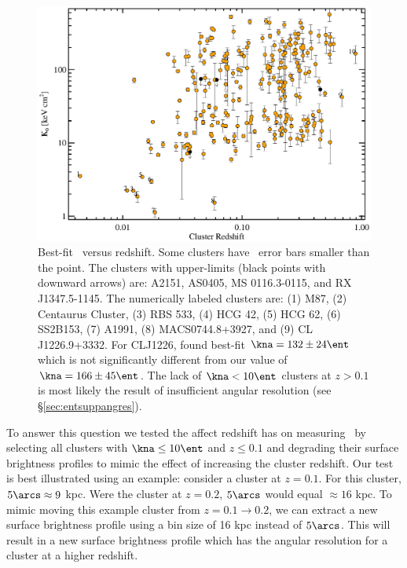 \begin{figure}[htp]
  \begin{center}
    \begin{minipage}[htp]{\linewidth}
      \includegraphics*[width=\textwidth, trim=5mm 0mm 5mm 5mm, clip]{k0res}
      \caption[Best-fit \kna\ versus redshift.]{Best-fit \kna\ versus
        redshift. Some clusters have \kna\ error bars smaller than the
        point. The clusters with upper-limits (black points with
        downward arrows) are: A2151, AS0405, MS 0116.3-0115, and RX
        J1347.5-1145. The numerically labeled clusters are: (1) M87,
        (2) Centaurus Cluster, (3) RBS 533, (4) HCG 42, (5) HCG 62,
        (6) SS2B153, (7) A1991, (8) MACS0744.8+3927, and (9) CL
        J1226.9+3332. For CLJ1226, \cite{2007ApJ...659.1125M} found
        best-fit $\kna = 132 \pm 24 \ent$ which is not significantly
        different from our value of $\kna = 166 \pm 45 \ent$. The lack
        of $\kna < 10 \ent$ clusters at $z > 0.1$ is most likely the
        result of insufficient angular resolution (see
        \S\ref{sec:entsuppangres}).}
      \label{fig:k0res}
    \end{minipage}
  \end{center}
\end{figure}

To answer this question we tested the affect redshift has on measuring
\kna\ by selecting all clusters with $\kna \leq 10 \ent$ and $z \leq
0.1$ and degrading their surface brightness profiles to mimic the
effect of increasing the cluster redshift. Our test is best
illustrated using an example: consider a cluster at $z = 0.1$. For
this cluster, $5\arcs \approx 9$ kpc. Were the cluster at $z = 0.2$, $5\arcs$
would equal $\approx 16$ kpc. To mimic moving this example cluster
from $z = 0.1 \rightarrow 0.2$, we can extract a new surface
brightness profile using a bin size of 16 kpc instead of $5\arcs$. This
will result in a new surface brightness profile which has the angular
resolution for a cluster at a higher redshift.

